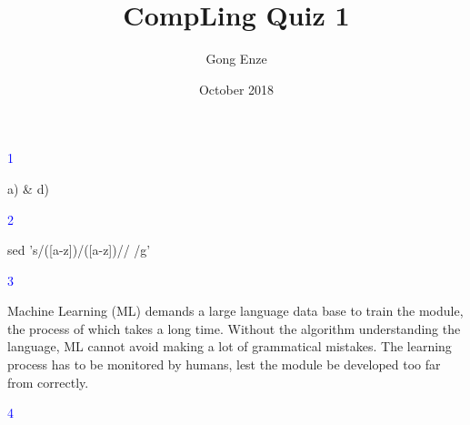 \documentclass{article}
\title{\Huge \textbf{CompLing Quiz 1}}
\author{\Large Gong Enze}
\date{October 2018}
\begin{document}
\setlength{\parindent}{4em}
\setlength{\parskip}{1em}

\maketitle
\newpage
\begin{flushleft}
\begin{Large}
\textcolor{blue}{1} \\
\end{Large}

\vspace{2mm}

\begin{large}
a) \& d)
\end{large}

\vspace{4mm}

\begin{Large}
\textcolor{blue}{2} \\
\end{Large}

\vspace{2mm}

\begin{large}

sed 's/\setminus([a-z]\setminus)\setminus/\setminus([a-z]\setminus)/\hspace{2mm}\setminus/\hspace{2mm} /g'

\end{large}
\vspace{4mm}

\begin{Large}
\textcolor{blue}{3} \\
\end{Large}

\vspace{2mm}

\begin{large}

Machine Learning (ML) demands a large language data base to train the module, the process of which takes a long time. Without the algorithm understanding the language, ML cannot avoid making a lot of grammatical mistakes. The learning process has to be monitored by humans, lest the module be developed too far from correctly.

\end{large}
\vspace{4mm}

\begin{Large}
\textcolor{blue}{4} \\
\end{Large}


\end{flushleft}
\end{document}
